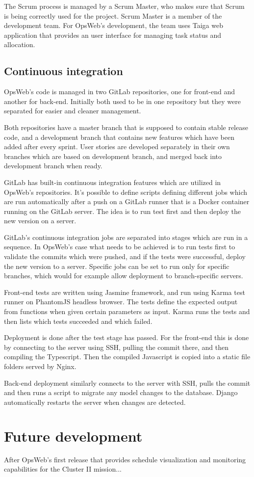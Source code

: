The Scrum process is managed by a Scrum Master, who makes sure that Scrum is being correctly used for the project. Scrum Master is a member of the development team. \cite{beck2001manifesto, scrum} For OpsWeb's development, the team uses Taiga web application that provides an user interface for managing task status and allocation.  \cite{taiga}

\subsection{Continuous integration}
OpsWeb's code is managed in two GitLab repositories, one for front-end and another for back-end. Initially both used to be in one repository but they were separated for easier and cleaner management.

Both repositories have a master branch that is supposed to contain stable release code, and a development branch that contains new features which have been added after every sprint. User stories are developed separately in their own branches which are based on development branch, and merged back into development branch when ready.

GitLab has built-in continuous integration features which are utilized in OpsWeb's repositories. It's possible to define scripts defining different jobs which are run automatically after a push on a GitLab runner that is a Docker container running on the GitLab server. The idea is to run test first and then deploy the new version on a server.

GitLab's continuous integration jobs are separated into stages which are run in a sequence. In OpsWeb's case what needs to be achieved is to run tests first to validate the commits which were pushed, and if the tests were successful, deploy the new version to a server. Specific jobs can be set to run only for specific branches, which would for example allow deployment to branch-specific servers.

Front-end tests are written using Jasmine framework, and run using Karma test runner on PhantomJS headless browser. The tests define the expected output from functions when given certain parameters as input. Karma runs the tests and then lists which tests succeeded and which failed.

Deployment is done after the test stage has passed. For the front-end this is done by connecting to the server using SSH, pulling the commit there, and then compiling the Typescript. Then the compiled Javascript is copied into a static file folders served by Nginx.

Back-end deployment similarly connects to the server with SSH, pulls the commit and then runs a script to migrate any model changes to the database. Django automatically restarts the server when changes are detected.
\section{Future development}
After OpsWeb's first release that provides schedule visualization and monitoring capabilities for the Cluster II mission...